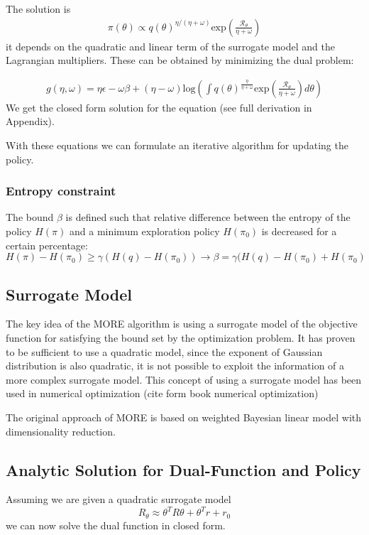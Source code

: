 The solution is
\begin{align}
\pi(\theta) \propto q(\theta)^{\eta/(\eta+\omega)} 
\text{exp}\left(\frac{\mathcal{R}_\theta}{\eta + \omega}\right)
\end{align}
it depends on the quadratic and linear term of the surrogate model and the
Lagrangian multipliers. These can be obtained by minimizing the dual problem:

\begin{align}
  g(\eta,\omega) = \eta\epsilon - \omega\beta + (\eta - \omega) \text{log}
\left(\int q(\theta)^{\frac{\eta}{\eta + \omega}}
  \text{exp}\left(\frac{\mathcal{R}_\theta}{\eta + \omega}\right) d\theta \right)
\end{align}
We get the closed form solution for the equation
(see full derivation in Appendix).

With these equations we can formulate an iterative algorithm for updating the policy.

\subsubsection{Entropy constraint}
The bound $\beta$ is defined such that relative difference between the entropy
of the policy $H(\pi)$ and a minimum exploration policy $H(\pi_0)$ is decreased
for a certain percentage:
$$ H(\pi) - H(\pi_0) \geq \gamma (H(q) - H(\pi_0))
\rightarrow \beta = \gamma (H(q) - H(\pi_0) + H(\pi_0) $$

\subsection{Surrogate Model}
The key idea of the MORE algorithm is using a surrogate model of the objective function
for satisfying the bound set by the optimization problem. It has proven to be
sufficient to use a quadratic model, since the exponent of Gaussian distribution
is also quadratic, it is not possible to exploit the information of a more
complex surrogate model. This concept of using a surrogate model has been used
in numerical optimization (cite form book numerical optimization)

The original approach of MORE is based on weighted Bayesian linear model with
dimensionality reduction.

\subsection{Analytic Solution for Dual-Function and Policy}
Assuming we are given a quadratic surrogate model
$$ R_\theta \approx \theta^T R \theta + \theta^T r + r_0 $$
we can now solve the dual function in closed form.

